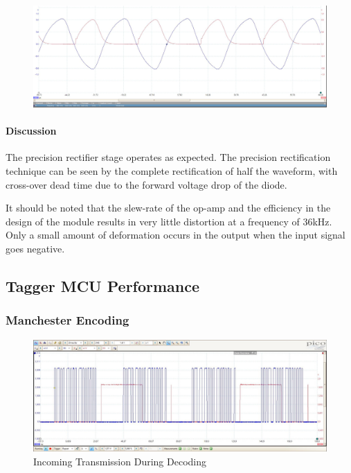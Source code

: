 \begin{figure}[H]
	\centering
	\includegraphics[width=\textwidth]{figures/results/rectification/36kHz.JPG}
	\label{fig:precision_rectification}
\end{figure}

\paragraph{Discussion}
The precision rectifier stage operates as expected. The precision rectification technique can be seen by the complete rectification of half the waveform, with cross-over dead time due to the forward voltage drop of the diode.

It should be noted that the slew-rate of the op-amp and the efficiency in the design of the module results in very little distortion at a frequency of 36kHz. Only a small amount of deformation occurs in the output when the input signal goes negative.



\subsection{Tagger MCU Performance}

\subsubsection{Manchester Encoding}

\begin{figure}[H]
	\centering
	\includegraphics[width=.8\textwidth]{figures/results/receiver_software/transmission_too_fast_crop.JPG}
	\caption{Incoming Transmission During Decoding}
	\label{fig:transmission_too_fast}
\end{figure}




